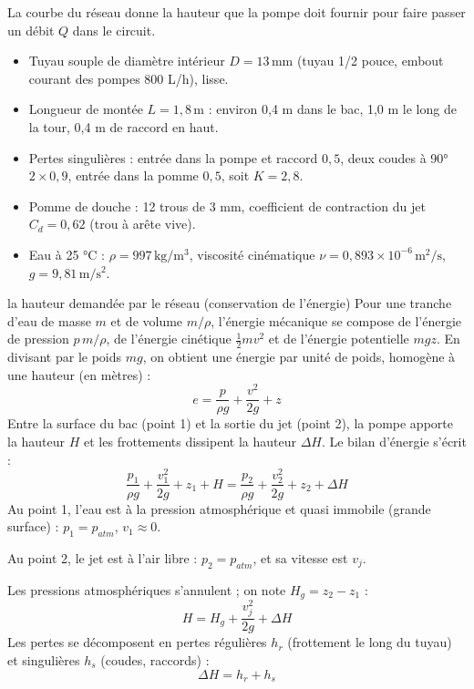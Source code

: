 \documentclass[11pt,a4paper]{article}
\newcommand{\U}[1]{\,\mathrm{#1}}
\begin{document}
La courbe du réseau donne la hauteur que la pompe doit fournir pour faire passer un débit $Q$ dans le circuit.

\begin{hypo}
\begin{itemize}
  \item Tuyau souple de diamètre intérieur $D = 13\U{mm}$ (tuyau 1/2 pouce, embout courant des pompes 800 L/h), lisse.
  \item Longueur de montée $L = 1{,}8\U{m}$ : environ 0,4 m dans le bac, 1,0 m le long de la tour, 0,4 m de raccord en haut.
  \item Pertes singulières : entrée dans la pompe et raccord $0{,}5$, deux coudes à 90° $2\times0{,}9$, entrée dans la pomme $0{,}5$, soit $K = 2{,}8$.
  \item Pomme de douche : 12 trous de 3 mm, coefficient de contraction du jet $C_d = 0{,}62$ (trou à arête vive).
  \item Eau à 25 °C : $\rho = 997\U{kg/m^3}$, viscosité cinématique $\nu = 0{,}893\times10^{-6}\U{m^2/s}$, $g = 9{,}81\U{m/s^2}$.
\end{itemize}
\end{hypo}

\begin{calcul}{la hauteur demandée par le réseau (conservation de l'énergie)}
Pour une tranche d'eau de masse $m$ et de volume $m/\rho$, l'énergie mécanique se compose de l'énergie de pression $p\,m/\rho$, de l'énergie cinétique $\tfrac12 m v^2$ et de l'énergie potentielle $m g z$. En divisant par le poids $m g$, on obtient une énergie par unité de poids, homogène à une hauteur (en mètres) :
\[ e = \frac{p}{\rho g} + \frac{v^2}{2g} + z \]
Entre la surface du bac (point 1) et la sortie du jet (point 2), la pompe apporte la hauteur $H$ et les frottements dissipent la hauteur $\Delta H$. Le bilan d'énergie s'écrit :
\[ \frac{p_1}{\rho g} + \frac{v_1^2}{2g} + z_1 + H = \frac{p_2}{\rho g} + \frac{v_2^2}{2g} + z_2 + \Delta H \]
Au point 1, l'eau est à la pression atmosphérique et quasi immobile (grande surface) : $p_1 = p_{atm}$, $v_1 \approx 0$.

Au point 2, le jet est à l'air libre : $p_2 = p_{atm}$, et sa vitesse est $v_j$.

Les pressions atmosphériques s'annulent ; on note $H_g = z_2 - z_1$ :
\[ H = H_g + \frac{v_j^2}{2g} + \Delta H \]
Les pertes se décomposent en pertes régulières $h_r$ (frottement le long du tuyau) et singulières $h_s$ (coudes, raccords) :
\[ \Delta H = h_r + h_s \]
\end{calcul}
\end{document}
